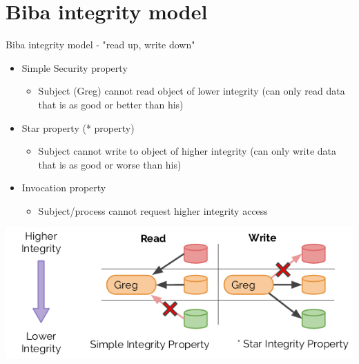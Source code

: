 \documentclass{article}[18pt]
\begin{document}
\section{Biba integrity model}
Biba integrity model - "read up, write down"
\begin{itemize}
	\item Simple Security property
	\begin{itemize}
		\item Subject (Greg) cannot read object of lower integrity (can only read data that is as good or better than his)
	\end{itemize}
	\item Star property (* property)
	\begin{itemize}
		\item Subject cannot write to object of higher integrity (can only write data that is as good or worse than his)
	\end{itemize}
	\item Invocation property
	\begin{itemize}
		\item Subject/process cannot request higher integrity access
	\end{itemize}
\end{itemize}
\begin{center}
	\includegraphics[scale=0.7]{biba}
\end{center}
\end{document}
